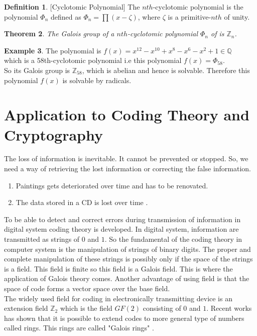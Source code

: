 \documentclass[11pt]{amsart}
\theoremstyle{plain}
\newtheorem{theorem}{Theorem}[section]
\theoremstyle{definition}
\newtheorem{definition}[theorem]{Definition}
\newtheorem{example}[theorem]{Example}
\numberwithin{equation}{section}
\begin{document}
\begin{definition} \cite{galois} [Cyclotomic Polynomial]
  The \(nth\)-cyclotomic polynomial is the polynomial \({\Phi}_n\) defined as \({\Phi}_n= \prod {(x-\zeta)}\), where \(\zeta\) is a primitive-\(nth\) of unity.
\end{definition}

\begin{theorem} \cite{galois}
  The Galois group of a \(nth\)-cyclotomic polynomial \({\Phi}_n\) of is \(\mathbb{Z}_n\).
\end{theorem}

\begin{example}
The polynomial is \(f(x)=x^{12}-x^{10}+x^8-x^6-x^2+1 \in \mathbb{Q}\)\\
which is a 58th-cyclotomic polynomial i.e this polynomial \(f(x)={\Phi}_{58}\).\\
  So its Galois group is \(\mathbb{Z}_{58}\), which is abelian and hence is solvable. Therefore this polynomial \(f(x)\) is solvable by radicals.
\end{example}

\vspace{9mm}
\section{Application to Coding Theory and Cryptography}
The loss of information is inevitable. It cannot be prevented or stopped. So, we need a way of retrieving the lost information or correcting the false information.

\begin{enumerate}
\item Paintings gets deteriorated over time and has to be renovated.
\item The data stored in a CD is lost over time \cite{coding}.
\end{enumerate}

To be able to detect and correct errors during transmission of information in digital system coding theory is developed. In digital system, information are transmitted as strings of \(0\) and \(1\). So the fundamental of the coding theory in computer system is the manipulation of strings of binary digits. The proper and complete manipulation of these strings is possibly only if the space of the strings is a field. This field is finite so this field is a Galois field. This is where the application of Galois theory comes. Another advantage of using field is that the space of code forms a vector space over the base field. \\
The widely used field for coding in electronically transmitting device is an extension field \({\mathbb{Z}}_2\) which is the field \(GF(2)\) consisting of \(0\) and \(1\). Recent works has shown that it is possible to extend codes to more general type of numbers called rings. This rings are called "Galois rings" \cite{error_correct}.\\
\end{document}

